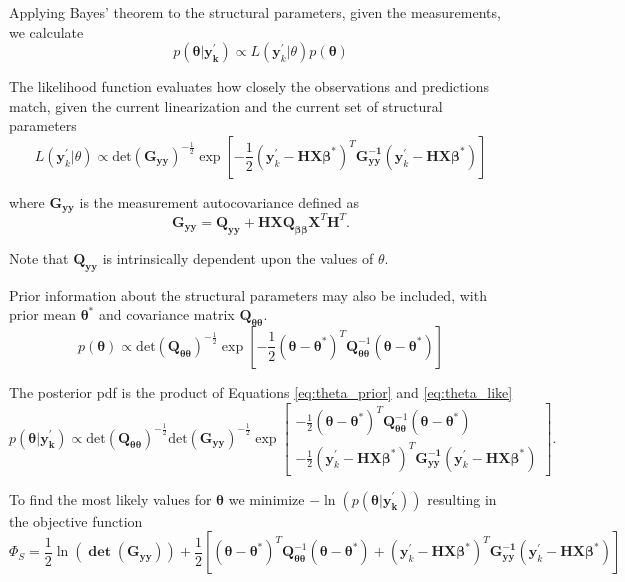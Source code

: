 \documentclass[11pt,oneside,onecolumn]{usgsreport}
\begin{document}
\begin{appendix}
Applying Bayes' theorem to the structural parameters, given the measurements,
we calculate
\[
p\left(\mathbf{\theta|\mathbf{y}_{k}^{'}}\right)\propto L\left(\mathbf{y}_{k}^{'}|\theta\right)p\left(\mathbf{\theta}\right)
\]


The likelihood function evaluates how closely the observations and
predictions match, given the current linearization and the current
set of structural parameters
\begin{equation}
L\left(\mathbf{y}_{k}^{'}|\theta\right)\propto\mathrm{det}\left(\mathbf{G_{yy}}\right)^{-\frac{1}{2}}\exp\left[-\frac{1}{2}\left(\mathbf{y}_{k}^{'}-\mathbf{HX\beta^{*}}\right)^{T}\mathbf{G_{yy}^{-1}}\left(\mathbf{y}_{k}^{'}-\mathbf{HX\beta^{*}}\right)\right]\label{eq:theta_like}
\end{equation}


where $\mathbf{G_{yy}}$ is the measurement autocovariance defined
as 
\[
\mathbf{G_{yy}}=\mathbf{Q_{yy}}+\mathbf{HXQ_{\beta\beta}X}^{T}\mathbf{H}^{T}.
\]


Note that $\mathbf{Q_{yy}}$ is intrinsically dependent upon the values
of $\theta.$

Prior information about the structural parameters may also be included,
with prior mean $\mathbf{\theta^{*}}$ and covariance matrix $\mathbf{Q_{\theta\theta}}$.
\begin{equation}
p\left(\mathbf{\theta}\right)\propto\mathrm{det}\left(\mathbf{Q_{\theta\theta}}\right)^{-\frac{1}{2}}\exp\left[-\frac{1}{2}\left(\mathbf{\theta-\theta^{*}}\right)^{T}\mathbf{Q}_{\mathbf{\theta\theta}}^{-1}\left(\mathbf{\theta-\theta^{*}}\right)\right]\label{eq:theta_prior}
\end{equation}


The posterior pdf is the product of Equations \ref{eq:theta_prior}
and \ref{eq:theta_like}
\[
p\left(\mathbf{\theta|\mathbf{y}_{k}^{'}}\right)\propto\mathrm{\mathrm{det}\left(\mathbf{Q_{\theta\theta}}\right)^{-\frac{1}{2}}det}\left(\mathbf{G_{yy}}\right)^{-\frac{1}{2}}\exp\left[\begin{array}{c}
-\frac{1}{2}\left(\mathbf{\theta-\theta^{*}}\right)^{T}\mathbf{Q}_{\mathbf{\theta\theta}}^{-1}\left(\mathbf{\theta-\theta^{*}}\right)\\
-\frac{1}{2}\left(\mathbf{y}_{k}^{'}-\mathbf{HX\beta^{*}}\right)^{T}\mathbf{G_{yy}^{-1}}\left(\mathbf{y}_{k}^{'}-\mathbf{HX\beta^{*}}\right)
\end{array}\right].
\]


To find the most likely values for $\mathbf{\theta}$ we minimize
$-\ln\left(p\left(\mathbf{\theta|\mathbf{y}_{k}^{'}}\right)\right)$
resulting in the objective function
\[
\Phi_{S}=\mathrm{\frac{1}{2}\ln\left(\mathbf{\det\left(G_{yy}\right)}\right)}+\frac{1}{2}\left[\left(\mathbf{\theta-\theta^{*}}\right)^{T}\mathbf{Q}_{\mathbf{\theta\theta}}^{-1}\left(\mathbf{\theta-\theta^{*}}\right)+\left(\mathbf{y}_{k}^{'}-\mathbf{HX\beta^{*}}\right)^{T}\mathbf{G_{yy}^{-1}}\left(\mathbf{y}_{k}^{'}-\mathbf{HX\beta^{*}}\right)\right]
\]



\end{appendix}
\end{document}
